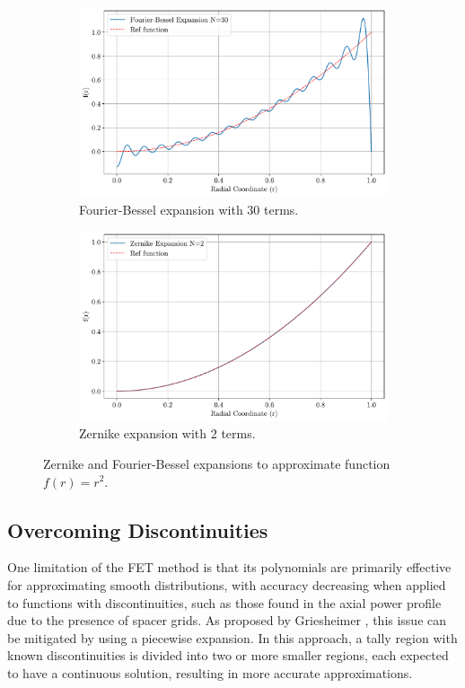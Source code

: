 \begin{figure}
    \centering
    \begin{subfigure}[b]{0.48\textwidth}
        \centering
        \includegraphics[width=\textwidth]{figs/bessel_exp_30.pdf}
        \caption{Fourier-Bessel expansion with 30 terms.}
    \end{subfigure}
    \hspace{1em}
    \begin{subfigure}[b]{0.48\textwidth}
        \centering
        \includegraphics[width=\textwidth]{figs/zernike_2b.pdf}
        \caption{Zernike expansion with 2 terms.}
    \end{subfigure}
    \caption{Zernike and Fourier-Bessel expansions to approximate function $f(r)=r^2$.}
    \label{fig_z}
\end{figure}

\subsection{Overcoming Discontinuities} \label{sec22x}
One limitation of the FET method is that its polynomials are primarily effective for approximating smooth distributions, with accuracy decreasing when applied to functions with discontinuities, such as those found in the axial power profile due to the presence of spacer grids. As proposed by Griesheimer \cite{gries}, this issue can be mitigated by using a piecewise expansion. In this approach, a tally region with known discontinuities is divided into two or more smaller regions, each expected to have a continuous solution, resulting in more accurate approximations.

